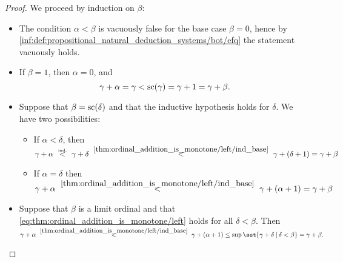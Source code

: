 \begin{proof}
   We proceed by induction on \( \beta \):
  \begin{itemize}
    \item The condition \( \alpha < \beta \) is vacuously false for the base case \( \beta = 0 \), hence by \ref{inf:def:propositional_natural_deduction_systems/bot/efq} the statement vacuously holds.

    \item If \( \beta = 1 \), then \( \alpha = 0 \), and
    \begin{equation}\label{thm:ordinal_addition_is_monotone/left/ind_base}
      \gamma + \alpha = \gamma < \op{sc}(\gamma) = \gamma + 1 = \gamma + \beta.
    \end{equation}

    \item Suppose that \( \beta = \op{sc}(\delta) \) and that the inductive hypothesis holds for \( \delta \). We have two possibilities:
    \begin{itemize}
      \item If \( \alpha < \delta \), then
      \begin{equation*}
        \gamma + \alpha
        \reloset {\T{ind.}} <
        \gamma + \delta
        \reloset {\eqref{thm:ordinal_addition_is_monotone/left/ind_base}} <
        \gamma + (\delta + 1)
        =
        \gamma + \beta
      \end{equation*}

      \item If \( \alpha = \delta \) then
      \begin{equation*}
        \gamma + \alpha
        \reloset {\eqref{thm:ordinal_addition_is_monotone/left/ind_base}} <
        \gamma + (\alpha + 1)
        =
        \gamma + \beta
      \end{equation*}
    \end{itemize}

    \item Suppose that \( \beta \) is a limit ordinal and that \eqref{eq:thm:ordinal_addition_is_monotone/left} holds for all \( \delta < \beta \). Then
    \begin{equation*}
      \gamma + \alpha
      \reloset {\eqref{thm:ordinal_addition_is_monotone/left/ind_base}} <
      \gamma + (\alpha + 1)
      \leq
      \sup\set{ \gamma + \delta \given \delta < \beta }
      =
      \gamma + \beta.
    \end{equation*}
  \end{itemize}


\end{proof}
